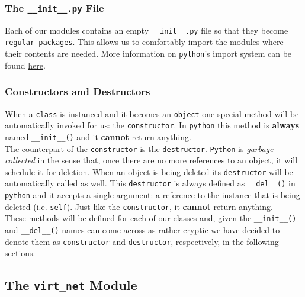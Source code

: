             \subsubsection{The \texttt{\_\_init\_\_.py} File}
                Each of our modules contains an empty \texttt{\_\_init\_\_.py} file so that they become \texttt{regular packages}. This allows us to comfortably import the modules where their contents are needed. More information on \texttt{python}'s import system can be found \href{https://docs.python.org/3/reference/import.html#regular-packages}{here}.

            \subsubsection{Constructors and Destructors}
                When a \texttt{class} is instanced and it becomes an \texttt{object} one special method will be automatically invoked for us: the \texttt{constructor}. In \texttt{python} this method is \textbf{always} named \texttt{\_\_init\_\_()} and it \textbf{cannot} return anything.\\

                The counterpart of the \texttt{constructor} is the \texttt{destructor}. \texttt{Python} is \textit{garbage collected} in the sense that, once there are no more references to an object, it will schedule it for deletion. When an object is being deleted its \texttt{destructor} will be automatically called as well. This \texttt{destructor} is always defined as \texttt{\_\_del\_\_()} in \texttt{python} and it accepts a single argument: a reference to the instance that is being deleted (i.e. \texttt{self}). Just like the \texttt{constructor}, it \textbf{cannot} return anything.\\

                These methods will be defined for each of our classes and, given the \texttt{\_\_init\_\_()} and \texttt{\_\_del\_\_()} names can come across as rather cryptic we have decided to denote them as \texttt{constructor} and \texttt{destructor}, respectively, in the following sections.\\

        \subsection{The \texttt{virt\_net} Module}
            
            
            
            
            
            
            
            


